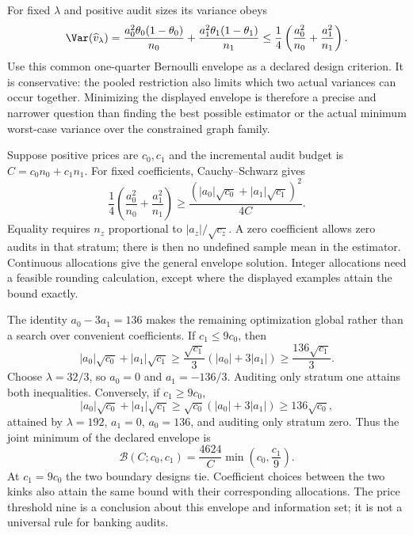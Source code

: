 For fixed $\lambda$ and positive audit sizes its variance obeys
\begin{equation}
 \Var(\widehat v_\lambda)
 =\frac{a_0^2\theta_0(1-\theta_0)}{n_0}
  +\frac{a_1^2\theta_1(1-\theta_1)}{n_1}
 \leq \frac14\left(\frac{a_0^2}{n_0}+\frac{a_1^2}{n_1}\right).
 \label{exec17:s7-constrained-variance}
\end{equation}
Use this common one-quarter Bernoulli envelope as a declared design criterion.
It is conservative: the pooled restriction also limits which two actual
variances can occur together. Minimizing the displayed envelope is therefore
a precise and narrower question than finding the best possible estimator or
the actual minimum worst-case variance over the constrained graph family.

Suppose positive prices are $c_0,c_1$ and the incremental audit budget is
$C=c_0n_0+c_1n_1$. For fixed coefficients, Cauchy--Schwarz gives
\begin{equation}
 \frac14\left(\frac{a_0^2}{n_0}+\frac{a_1^2}{n_1}\right)
 \geq \frac{\left(|a_0|\sqrt{c_0}+|a_1|\sqrt{c_1}\right)^2}{4C}.
 \label{exec17:s7-constrained-budget}
\end{equation}
Equality requires $n_z$ proportional to $|a_z|/\sqrt{c_z}$. A zero coefficient
allows zero audits in that stratum; there is then no undefined sample mean in
the estimator. Continuous allocations give the general envelope solution.
Integer allocations need a feasible rounding calculation, except where the
displayed examples attain the bound exactly.

The identity $a_0-3a_1=136$ makes the remaining optimization global rather
than a search over convenient coefficients. If $c_1\leq9c_0$, then
\begin{equation}
 |a_0|\sqrt{c_0}+|a_1|\sqrt{c_1}
 \geq \frac{\sqrt{c_1}}3(|a_0|+3|a_1|)
 \geq \frac{136\sqrt{c_1}}3.
 \label{exec17:s7-stratum1-proof}
\end{equation}
Choose $\lambda=32/3$, so $a_0=0$ and $a_1=-136/3$. Auditing only stratum
one attains both inequalities. Conversely, if $c_1\geq9c_0$,
\begin{equation}
 |a_0|\sqrt{c_0}+|a_1|\sqrt{c_1}
 \geq \sqrt{c_0}(|a_0|+3|a_1|)
 \geq136\sqrt{c_0},
 \label{exec17:s7-stratum0-proof}
\end{equation}
attained by $\lambda=192$, $a_1=0$, $a_0=136$, and auditing only stratum
zero. Thus the joint minimum of the declared envelope is
\begin{equation}
 \mathcal B(C;c_0,c_1)=\frac{4624}{C}
                  \min\left(c_0,\frac{c_1}{9}\right).
 \label{exec17:s7-constrained-optimum}
\end{equation}
At $c_1=9c_0$ the two boundary designs tie. Coefficient choices between the
two kinks also attain the same bound with their corresponding allocations.
The price threshold nine is a conclusion about this envelope and information
set; it is not a universal rule for banking audits.

